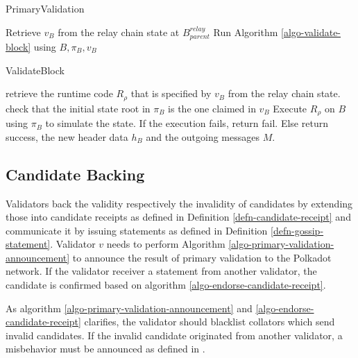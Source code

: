 \begin{algorithm}[H]
  \caption[]{\sc PrimaryValidation}
  \label{algo-primary-validation}
  \begin{algorithmic}[1]

    \State Retrieve $v_B$ from the relay chain state at $B^{relay}_{parent}$
    \State Run Algorithm \ref{algo-validate-block} using $B, \pi_B, v_B$
  \end{algorithmic}
\end{algorithm}

\begin{algorithm}[H]
  \caption[]{\sc ValidateBlock}
  \label{algo-validate-block}
  \begin{algorithmic}[1]
    \State retrieve the runtime code $R_\rho$ that is specified by $v_B$ from the relay chain state.
    \State check that the initial state root in $\pi_B$ is the one claimed in $v_B$
    \State Execute $R_\rho$ on $B$ using $\pi_B$ to simulate the state.
    \State If the execution fails, return fail.
    \State Else return success, the new header data $h_B$ and the outgoing messages $M$. 
  \end{algorithmic}
\end{algorithm}

\subsection{Candidate Backing}
\label{sect-primary-validaty-announcement}

Validators back the validity respectively the invalidity of candidates by
extending those into candidate receipts as defined in Definition
\ref{defn-candidate-receipt} and communicate it by issuing statements as defined
in Definition \ref{defn-gossip-statement}. Validator $v$ needs to perform
Algorithm \ref{algo-primary-validation-announcement} to announce the result of
primary validation to the Polkadot network. If the validator receiver a
statement from another validator, the candidate is confirmed based on algorithm
\ref{algo-endorse-candidate-receipt}.
\newline

As algorithm \ref{algo-primary-validation-announcement} and
\ref{algo-endorse-candidate-receipt} clarifies, the validator should blacklist
collators which send invalid candidates. If the invalid candidate originated from
another validator, a misbehavior must be announced as defined in .
\newline


